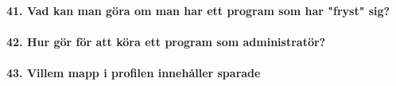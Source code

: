 \paragraph{41. Vad kan man göra om man har ett program som har "fryst" sig?}

\paragraph{42. Hur gör för att köra ett program som administratör?}

\paragraph{43. Villem mapp i profilen innehåller sparade }










